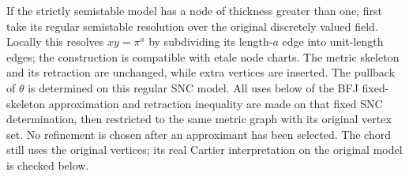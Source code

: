If the strictly semistable model has a node of thickness greater than
one, first take its regular semistable resolution over the original
discretely valued field.  Locally this resolves \(xy=\pi^a\) by
subdividing its length-\(a\) edge into unit-length edges; the construction
is compatible with etale node charts.  The metric skeleton and its
retraction are unchanged, while extra vertices are inserted.
The pullback of \(\theta\) is determined on this regular SNC model.
All uses below of the BFJ fixed-skeleton approximation and retraction
inequality are made on that fixed SNC determination, then restricted
to the same metric graph with its original vertex set.  No refinement
is chosen after an approximant has been selected.  The chord still
uses the original vertices; its real Cartier interpretation on the
original model is checked below.

